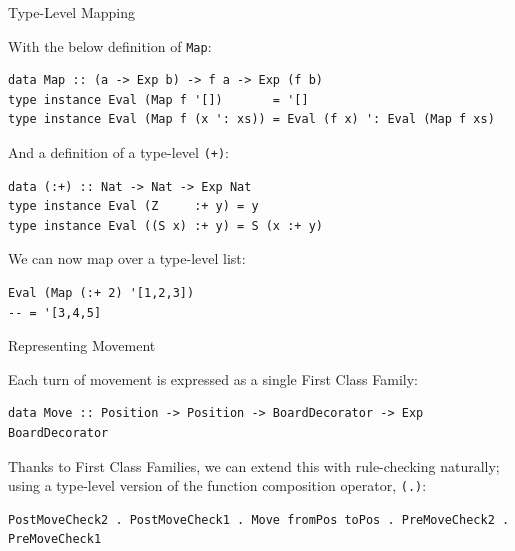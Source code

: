 \documentclass{beamer}
\newcommand{\inline}[1]{\lstinline[basicstyle=\ttfamily]{#1}}
\begin{document}
\begin{frame}[fragile]{Type-Level Mapping}

With the below definition of \inline{Map}:

\begin{lstlisting}
data Map :: (a -> Exp b) -> f a -> Exp (f b)
type instance Eval (Map f '[])       = '[]
type instance Eval (Map f (x ': xs)) = Eval (f x) ': Eval (Map f xs)
\end{lstlisting}

And a definition of a type-level \inline{(+)}:

\begin{lstlisting}
data (:+) :: Nat -> Nat -> Exp Nat
type instance Eval (Z     :+ y) = y
type instance Eval ((S x) :+ y) = S (x :+ y)
\end{lstlisting}

We can now map over a type-level list:

\begin{lstlisting}
Eval (Map (:+ 2) '[1,2,3])
-- = '[3,4,5]
\end{lstlisting}

\end{frame}

\begin{frame}[fragile]{Representing Movement}


Each turn of movement is expressed as a single First Class Family:

\begin{lstlisting}
data Move :: Position -> Position -> BoardDecorator -> Exp BoardDecorator
\end{lstlisting}

\pause

Thanks to First Class Families, we can extend this with rule-checking naturally; using a type-level version of the function composition operator, \inline{(.)}:

\begin{lstlisting}
PostMoveCheck2 . PostMoveCheck1 . Move fromPos toPos . PreMoveCheck2 . PreMoveCheck1
\end{lstlisting}

\end{frame}
\end{document}

